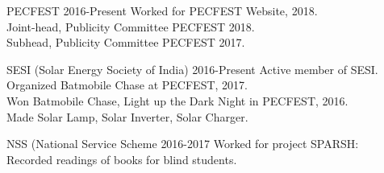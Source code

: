  
\begin{entryzlist}

\entryz

{PECFEST {}}
{2016-Present}
{Worked for PECFEST Website, 2018.
\\
Joint-head, Publicity Committee PECFEST 2018.
\\
Subhead, Publicity Committee PECFEST 2017.}

\entryz

{SESI (Solar Energy Society of India) {}}
{2016-Present}
{Active member of SESI.
\\
Organized Batmobile Chase at PECFEST, 2017.
\\
Won Batmobile Chase, Light up the Dark Night in PECFEST, 2016.
\\
Made Solar Lamp, Solar Inverter, Solar Charger.}


\entryz

{NSS (National Service Scheme {}}
{2016-2017}
{Worked for project SPARSH: 
\\
Recorded readings of books for blind students.}



\end{entryzlist}